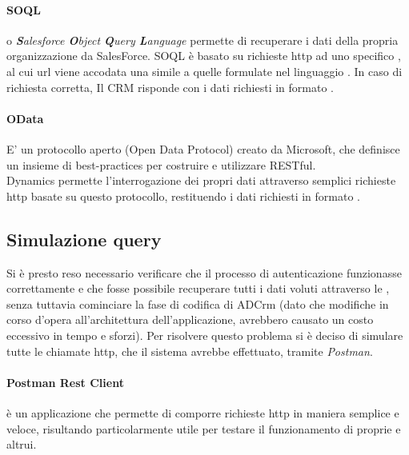 \documentclass[12pt,a4paper,twoside,openany,english]{book}
\begin{document}
			\paragraph{SOQL}
			o \textit{\textbf{S}alesforce \textbf{O}bject \textbf{Q}uery \textbf{L}anguage} permette di recuperare i dati della propria organizzazione da SalesForce. SOQL è basato su richieste \gls{http} ad uno specifico , al cui url viene accodata una  simile a quelle formulate nel linguaggio . In caso di richiesta corretta, Il \gls{CRM} risponde con i dati richiesti in formato .
			\paragraph{OData}
			E' un protocollo aperto (Open Data Protocol) creato da Microsoft, che definisce un insieme di best-practices per costruire e utilizzare  RESTful.\\
			Dynamics permette l'interrogazione dei propri dati attraverso semplici richieste \gls{http} basate su questo protocollo, restituendo i dati richiesti in formato .
			
		\subsection{Simulazione query}
			Si è presto reso necessario verificare che il processo di autenticazione funzionasse correttamente e che fosse possibile recuperare tutti i dati voluti attraverso le , senza tuttavia cominciare la fase di codifica di ADCrm (dato che modifiche in corso d'opera all'architettura dell'applicazione, avrebbero causato un costo eccessivo in tempo e sforzi).
			Per risolvere questo problema si è deciso di simulare tutte le chiamate \gls{http}, che il sistema avrebbe effettuato, tramite \textit{Postman}.
			\paragraph{Postman Rest Client} è un applicazione che permette di comporre richieste \gls{http} in maniera semplice e veloce, risultando particolarmente utile per testare il funzionamento di  proprie e altrui.
			\par
						
\end{document}
